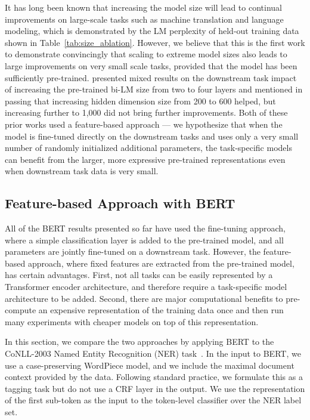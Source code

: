 It has long been known that increasing the model size will lead to continual improvements on large-scale tasks such as machine translation and language modeling, which is demonstrated by the LM perplexity of held-out training data shown in Table~\ref{tab:size_ablation}. However, we believe that this is the first work to demonstrate convincingly that scaling to extreme model sizes also leads to large improvements on very small scale tasks, provided that the model has been sufficiently pre-trained. \citet{peters2018dissecting} presented mixed results on the downstream task impact of increasing the pre-trained bi-LM size from two to four layers and \citet{melamud2016context2vec} mentioned in passing that increasing hidden dimension size from 200 to 600 helped, but increasing further to 1,000 did not bring further improvements. Both of these prior works used a feature-based approach --- we hypothesize that when the model is fine-tuned directly on the downstream tasks and uses only a very small number of randomly initialized additional parameters, the task-specific models can benefit from the larger, more expressive pre-trained representations even when downstream task data is very small. 



\subsection{Feature-based Approach with BERT}
\label{sec:ner}
All of the BERT results presented so far have used the fine-tuning approach, where a simple classification layer is added to the pre-trained model, and all parameters are jointly fine-tuned on a downstream task. However, the feature-based approach, where fixed features are extracted from the pre-trained model, has certain advantages. First, not all
tasks can be easily represented by a Transformer encoder architecture, and therefore require a task-specific model architecture to be added. Second, there are major computational benefits to
pre-compute an expensive representation of the training data once and then run many experiments with 
cheaper
models on top of this representation. 

In this section, we compare the two approaches by applying BERT to the CoNLL-2003 Named Entity Recognition (NER) task~\cite{tjong-de:2003}. In the input to BERT, we use a case-preserving WordPiece model, and we include the maximal document context provided by the data. Following standard practice, we formulate this as a tagging task but do not use a CRF layer in the output. We use the representation of the first sub-token as the input to the token-level classifier over the NER label set.


